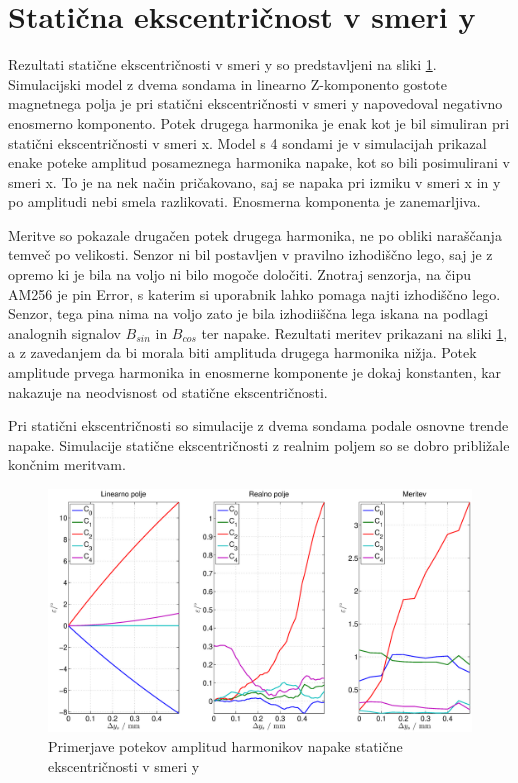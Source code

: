 \section{Statična ekscentričnost v smeri y}
Rezultati statične ekscentričnosti v smeri y so predstavljeni na sliki \ref{primerjava_ys}. Simulacijski model z dvema sondama in linearno Z-komponento gostote magnetnega polja je pri statični ekscentričnosti v smeri y napovedoval negativno enosmerno komponento. Potek drugega harmonika je enak kot je bil simuliran pri statični ekscentričnosti v smeri x. Model s 4 sondami je v simulacijah prikazal  enake poteke amplitud posameznega harmonika napake, kot so bili posimulirani v smeri x. To je na nek način pričakovano, saj se napaka pri izmiku v smeri x in y po amplitudi nebi smela razlikovati. Enosmerna komponenta je zanemarljiva.

Meritve so pokazale drugačen potek drugega harmonika, ne po obliki naraščanja temveč po velikosti. Senzor ni bil postavljen v pravilno izhodiščno lego, saj je z opremo ki je bila na voljo ni bilo mogoče določiti. Znotraj senzorja, na čipu AM256 je pin Error, s katerim si uporabnik lahko pomaga najti izhodiščno lego. Senzor, tega pina nima na voljo zato je bila izhodiiščna lega iskana na podlagi analognih signalov $B_{sin}$ in $B_{cos}$ ter napake. Rezultati meritev prikazani na sliki \ref{primerjava_ys}, a z zavedanjem da bi morala biti amplituda drugega harmonika nižja. Potek amplitude prvega harmonika in enosmerne komponente je dokaj konstanten, kar nakazuje na neodvisnost od statične ekscentričnosti.

Pri statični ekscentričnosti so simulacije z dvema sondama podale osnovne trende napake. Simulacije statične ekscentričnosti z realnim poljem so se dobro približale končnim meritvam.
\begin{figure}[ht]

	\centering
	\includegraphics[width=\columnwidth]{./Slike/primerjava_ys.eps}
	\caption{Primerjave potekov amplitud harmonikov napake  statične ekscentričnosti v smeri y}
	\label{primerjava_ys}
\end{figure}

